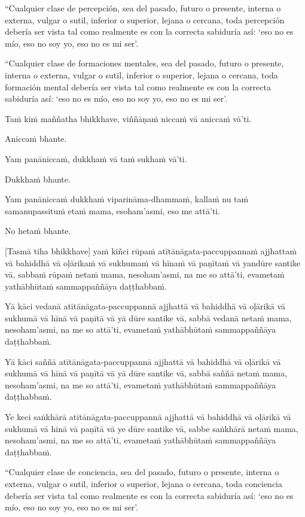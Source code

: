 “Cualquier clase de percepción, sea del pasado, futuro o presente, interna o externa, vulgar o sutil, inferior o superior, lejana o cercana, toda percepción debería ser vista tal como realmente es con la correcta sabiduría así: ‘eso no es mío, eso no soy yo, eso no es mi ser’.

“Cualquier clase de formaciones mentales, sea del pasado, futuro o presente, interna o externa, vulgar o sutil, inferior o superior, lejana o cercana, toda formación mental debería ser vista tal como realmente es con la correcta sabiduría así: ‘eso no es mío, eso no soy yo, eso no es mi ser’.



\clearpage

\paliText
\markboth{\paliTitle}{\rightmark}

Taṁ kiṁ maññatha bhikkhave, viññāṇaṁ niccaṁ vā aniccaṁ vā'ti.

Aniccaṁ bhante.

Yam panāniccaṁ, dukkhaṁ vā taṁ sukhaṁ vā'ti.

Dukkhaṁ bhante.

Yam panāniccaṁ dukkhaṁ viparināma-dhammaṁ, kallaṁ nu taṁ samanupassituṁ
etaṁ mama, esoham'asmi, eso me attā'ti.

No hetaṁ bhante.

[Tasmā tiha bhikkhave] yaṁ kiñci rūpaṁ atītānāgata-paccuppannaṁ ajjhattaṁ
vā bahiddhā vā oḷārikaṁ vā sukhumaṁ vā hīnaṁ vā paṇītaṁ vā yandūre
santike vā, sabbaṁ rūpaṁ netaṁ mama, nesoham'asmi, na me so attā'ti,
evametaṁ yathābhūtaṁ sammappaññāya daṭṭhabbaṁ.

Yā kāci vedanā atītānāgata-paccuppannā ajjhattā vā bahiddhā vā oḷārikā
vā sukhumā vā hīnā vā paṇītā vā yā dūre santike vā, sabbā vedanā netaṁ
mama, nesoham'asmi, na me so attā'ti, evametaṁ yathābhūtaṁ sammappaññāya
daṭṭhabbaṁ.

Yā kāci saññā atītānāgata-paccuppannā ajjhattā vā bahiddhā vā oḷārikā vā
sukhumā vā hīnā vā paṇītā vā yā dūre santike vā, sabbā saññā netaṁ mama,
nesoham'asmi, na me so attā'ti, evametaṁ yathābhūtaṁ sammappaññāya
daṭṭhabbaṁ.

Ye keci saṅkhārā atītānāgata-paccuppannā ajjhattā vā bahiddhā vā oḷārikā
vā sukhumā vā hīnā vā paṇītā vā ye dūre santike vā, sabbe saṅkhārā netaṁ
mama, nesoham'asmi, na me so attā'ti, evametaṁ yathābhūtaṁ sammappaññāya
daṭṭhabbaṁ.

\clearpage

\englishText
\markboth{\englishTitle}{\rightmark}

“Cualquier clase de conciencia, sea del pasado, futuro o presente, interna o externa, vulgar o sutil, inferior o superior, lejana o cercana, toda conciencia debería ser vista tal como realmente es con la correcta sabiduría así: ‘eso no es mío, eso no soy yo, eso no es mi ser’.

